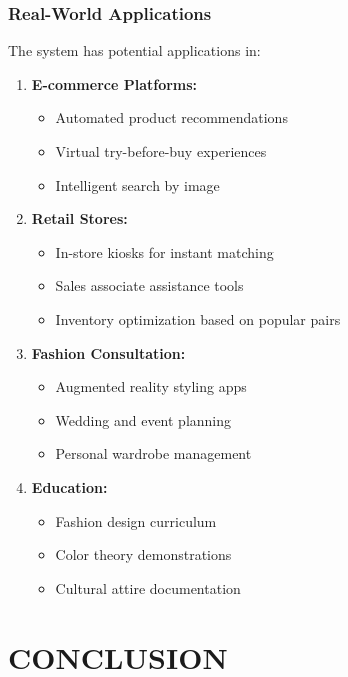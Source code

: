 \documentclass[12pt,a4paper]{report}
\begin{document}
\subsection{Real-World Applications}

The system has potential applications in:

\begin{enumerate}
    \item \textbf{E-commerce Platforms:}
    \begin{itemize}
        \item Automated product recommendations
        \item Virtual try-before-buy experiences
        \item Intelligent search by image
    \end{itemize}
    
    \item \textbf{Retail Stores:}
    \begin{itemize}
        \item In-store kiosks for instant matching
        \item Sales associate assistance tools
        \item Inventory optimization based on popular pairs
    \end{itemize}
    
    \item \textbf{Fashion Consultation:}
    \begin{itemize}
        \item Augmented reality styling apps
        \item Wedding and event planning
        \item Personal wardrobe management
    \end{itemize}
    
    \item \textbf{Education:}
    \begin{itemize}
        \item Fashion design curriculum
        \item Color theory demonstrations
        \item Cultural attire documentation
    \end{itemize}
\end{enumerate}

\chapter{CONCLUSION}
\end{document}
